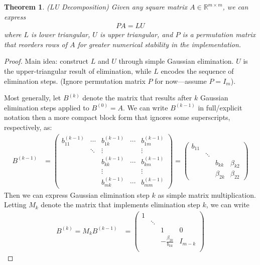 \documentclass[12pt]{book}
\numberwithin{equation}{section} %
\theoremstyle{plain}
\newtheorem{thm}{Theorem}[section]
\theoremstyle{definition}
\theoremstyle{remark}
\newcommand{\Rmm}{\mathbb{R}^{m\times m}}
\begin{document}
\begin{thm}\emph{(LU Decomposition)}
Given any square matrix $A\in\Rmm$, we can express
\begin{align}
  PA = LU
  \label{ludecomp}
\end{align}
where $L$ is lower triangular, $U$ is upper triangular, and $P$ is a
permutation matrix that reorders rows of $A$ for greater numerical
stability in the implementation.
\end{thm}
\begin{proof}%
Main idea:
construct $L$ and $U$ through simple Gaussian elimination.
$U$ is the upper-triangular result of elimination, while
$L$ encodes the sequence of elimination steps.
(Ignore permutation matrix $P$ for now---assume $P=I_m$).

Most generally, let $B^{(k)}$ denote the matrix that results after $k$
Gaussian elimination steps applied to $B^{(0)}=A$. We can write
$B^{(k-1)}$ in full/explicit notation then a more compact block form
that ignores some superscripts, respectively, as:
\begin{align*}
  B^{(k-1)}
  &=
  \begin{pmatrix}
    b_{11}^{(k-1)} & \cdots & b_{1k}^{(k-1)} & \cdots & b_{1m}^{(k-1)}\\
    & \ddots & \vdots  & & \vdots\\
    & & b_{kk}^{(k-1)} & \cdots & b_{km}^{(k-1)} \\
    & & \vdots & & \vdots \\
    & & b_{mk}^{(k-1)} & \cdots & b_{mm}^{(k-1)}
  \end{pmatrix}
  =
  \begin{pmatrix}
    b_{11} & \\
    & \ddots &  & \\
    & & b_{kk} & \beta_{k2} \\
    & & \beta_{2k} & \beta_{22}
  \end{pmatrix}
\end{align*}
Then we can express Gaussian elimination step $k$ as simple matrix
multiplication. Letting $M_k$ denote the matrix that implements
elimination step $k$, we can write
\begin{align*}
  B^{(k)} = M_k B^{(k-1)}
  &=
  \begin{pmatrix}
    1 & \\
      & \ddots & & \\
      &  & 1 & 0 \\
      &  & -\frac{\beta_{2k}}{b_{kk}} & I_{m-k}\\

\end{pmatrix}
\end{align*}
\end{proof}
\end{document}
